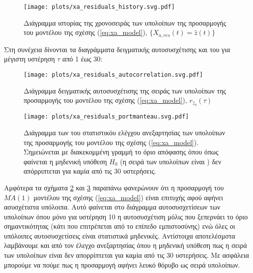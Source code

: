 \begin{figure}[H]
    \begin{center}
        \texttt{[image: plots/xa\_residuals\_history.svg.pdf]}
        \caption{Διάγραμμα ιστορίας της χρονοσειράς των υπολοίπων της προσαρμογής του μοντέλου της σχέσης (\ref{eq:xa_model}), $\{X_{a,res}(t) = \hat{z}(t)\}$}
        \label{fig:xa_residuals_history}
    \end{center}
\end{figure}

Στη συνέχεια δίνονται τα διαγράμματα δειγματικής αυτοσυσχέτισης και  του  για μέγιστη υστέρηση $\tau$ από 1 έως 30:

\begin{figure}[H]
    \begin{center}
        \texttt{[image: plots/xa\_residuals\_autocorrelation.svg.pdf]}
        \caption{Διάγραμμα δειγματικής αυτοσυσχέτισης της σειράς των υπολοίπων της προσαρμογής του μοντέλου της σχέσης (\ref{eq:xa_model}), $r_{\hat{z}_a}(\tau)$}
        \label{fig:xa_residuals_autocorrelation}
    \end{center}
\end{figure}

\begin{figure}[H]
    \begin{center}
        \texttt{[image: plots/xa\_residuals\_portmanteau.svg.pdf]}
        \caption{Διάγραμμα των  του στατιστικόυ ελέγχου ανεξαρτησίας  των υπολοίπων της προσαρμογής του μοντέλου της σχέσης (\ref{eq:xa_model}). Σημειώνεται με διακεκομμένη γραμμή το όριο απόφασης όπου όπως φαίνεται η μηδενική υπόθεση $H_0$ (η σειρά των υπολοίπων είναι ) δεν απόρριπτεται για καμία από τις 30 υστερήσεις.}
        \label{fig:xa_residuals_portmanteau}
    \end{center}
\end{figure}

Αμφότερα τα σχήματα \ref{fig:xa_residuals_autocorrelation} και \ref{fig:xa_residuals_portmanteau} παραπάνω φανερώνουν ότι η προσαρμογή του $MA(1)$ μοντέλου της σχέσης (\ref{eq:xa_model}) είναι επιτυχής αφού αφήνει ασυσχέτιστα υπόλοιπα. Αυτό φαίνεται στο διάγραμμα αυτοσυσχετίσεων των υπολοίπων όπου μόνο για υστέρηση 10 η αυτοσυσχέτιση μόλις που ξεπερνάει το όριο σημαντικότητας (κάτι που επιτρέπεται από το επίπεδο εμπιστοσύνης) ενώ όλες οι υπόλοιπες αυτοσυσχετίσεις είναι στατιστικά μηδενικές. Αντίστοιχα αποτελέσμστα λαμβάνουμε και από τον έλεγχο ανεξαρτησίας  όπου η μηδενική υπόθεση πως η σειρά των υπολοίπων είναι  δεν απορρίπτεται για καμία από τις 30 υστερήσεις. Με ασφάλεια μπορούμε να πούμε πως η προσαρμογή αφήνει λευκό θόρυβο ως σειρά υπολοίπων.


